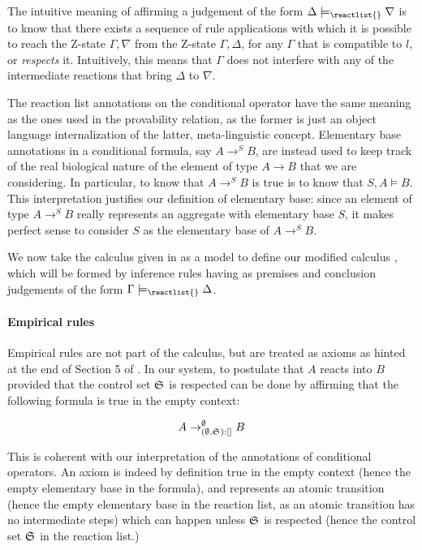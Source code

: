The intuitive meaning of affirming a judgement of the form
$\Delta \models_{\reactlist{}} \nabla$ is to know that there exists a sequence
of \eznd{} rule applications with which it is possible to reach the Z-state
$\Gamma, \nabla$ from the Z-state $\Gamma, \Delta$, for any $\Gamma$ that is
compatible to $l$, or \emph{respects} it. Intuitively, this means that $\Gamma$
does not interfere with any of the intermediate reactions that bring $\Delta$ to
$\nabla$.

The reaction list annotations on the conditional operator have the same meaning
as the ones used in the provability relation, as the former is just an object
language internalization of the latter, meta-linguistic concept.  Elementary
base annotations in a conditional formula, say $A \rightarrow^S B$, are instead
used to keep track of the real biological nature of the element of type
$A \rightarrow B$ that we are considering.
In particular, to know that $A \rightarrow^S B$ is true is to know that $S, A
\models B$. This interpretation justifies our definition of elementary base:
since an element of type $A \rightarrow^S B$ really represents an aggregate with
elementary base $S$, it makes perfect sense to consider $S$ as the elementary
base of $A \rightarrow^S B$.

We now take the calculus \znd{} given in \cite{adding-logic} as a model to define our
modified calculus \eznd{}, which will be formed by inference rules having as
premises and conclusion judgements of the form
$\Gamma \models_{\reactlist{}} \Delta$.

\paragraph{Empirical rules}

Empirical rules are not part of the calculus, but are treated as axioms as
hinted at the end of Section 5 of \cite{adding-logic}. In our system, to
postulate that $A$ reacts into $B$ provided that the control set $\mathfrak{S}_{}$ is
respected can be done by affirming that the following formula is true in the
empty context:

\[
  A \rightarrow_{(\emptyset, \mathfrak{S}_{}):[]}^\emptyset B
\]

This is coherent with our interpretation of the annotations of conditional
operators. An axiom is indeed by definition true in the empty context (hence the
empty elementary base in the formula), and represents an atomic transition
(hence the empty elementary base in the reaction list, as an atomic transition
has no intermediate steps) which can happen unless $\mathfrak{S}_{}$ is respected
(hence the control set $\mathfrak{S}_{}$ in the reaction list.)


